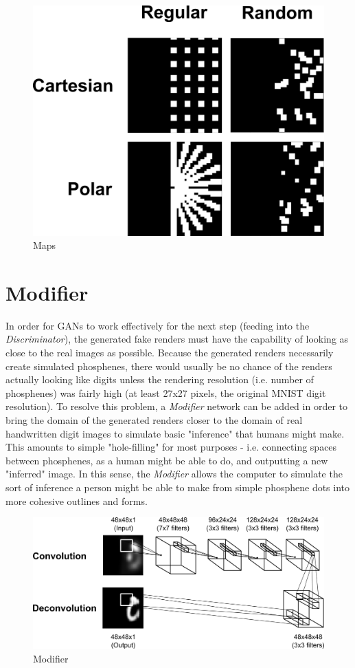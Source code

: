 \documentclass[a4paper,11pt,openany]{book}
\begin{document}
\begin{figure}[htbp]
\centering
\includegraphics[width=.9\linewidth]{./images/methods_maps.png}
\caption{\label{fig:org5f212fd}
Maps}
\end{figure}

\section*{Modifier}
\label{sec:orgd3a1fe8}

In order for GANs to work effectively for the next step (feeding into the \emph{Discriminator}), the generated fake renders must have the capability of looking as close to the real images as possible.
Because the generated renders necessarily create simulated phosphenes, there would usually be no chance of the renders actually looking like digits unless the rendering resolution (i.e. number of phosphenes) was fairly high (at least 27x27 pixels, the original MNIST digit resolution).
To resolve this problem, a \emph{Modifier} network can be added in order to bring the domain of the generated renders closer to the domain of real handwritten digit images to simulate basic "inference" that humans might make.
This amounts to simple "hole-filling" for most purposes - i.e. connecting spaces between phosphenes, as a human might be able to do, and outputting a new "inferred" image.
In this sense, the \emph{Modifier} allows the computer to simulate the sort of inference a person might be able to make from simple phosphene dots into more cohesive outlines and forms.


\begin{figure}[htbp]
\centering
\includegraphics[width=.9\linewidth]{./images/methods_modifier.png}
\caption{\label{fig:orge8e61da}
Modifier}
\end{figure}
\end{document}
